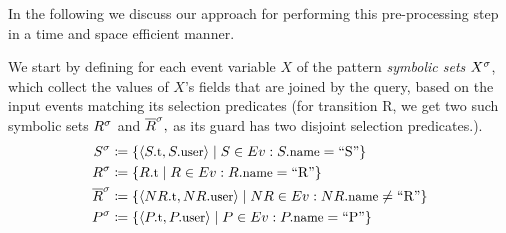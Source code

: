 

In the following we discuss our approach for performing this pre-processing step
in a time and space efficient manner.  

We start by defining for each event variable $X$ of the pattern 
{\em symbolic sets} ${X}^{\sigma}$, which collect the values of $X$'s fields that 
are joined by the query, based on the input events matching its selection 
predicates (for transition R, we get two such symbolic sets ${R}^{\sigma}$ and 
${\overline{R}}^{\sigma},$ as its guard has two disjoint selection predicates.). 
\begin{align*}
\syms{S} 
&\coloneq 
\{ \tuple{\facc{S}{t}, \facc{S}{user}} \mid 
S \in \Ev: \facc{S}{name} = \text{``S''}
\}
\\
\syms{R} 
&\coloneq 
\{ \facc{R}{t} \mid 
R \in \Ev: \facc{R}{name} = \text{``R''}
\}
\\
\syms{\oR} 
&\coloneq 
\{ \tuple{\facc{NR}{t}, \facc{NR}{user}} \mid 
NR \in \Ev: \facc{NR}{name} \neq \text{``R''}
\}
\\
\syms{P} 
&\coloneq 
\{ \tuple{\facc{P}{t}, \facc{P}{user}} \mid 
P \in \Ev: \facc{P}{name} = \text{``P''}
\}
\end{align*}


